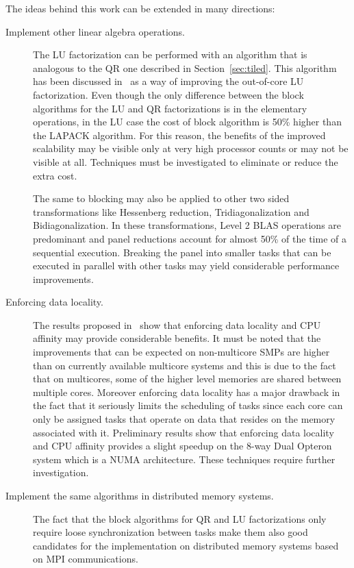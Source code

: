 \documentclass[runningheads]{llncs}
\begin{document}
\noindent
The ideas behind this work can be extended in many directions:
\begin{description}
\item[Implement other linear algebra operations.] The LU factorization
  can be performed with an algorithm that is analogous to the QR one
  described in Section~\ref{sec:tiled}. This algorithm has been
  discussed in~\cite{yip_ooc,vdgooclu} as a way of improving the out-of-core LU factorization.
  Even though the only difference between the
  block algorithms for the LU and QR factorizations is in the elementary
  operations, in the LU case the cost of block algorithm is 50\%
  higher than the LAPACK algorithm. For this reason, the benefits of
  the improved scalability may be visible only at very high processor
  counts or may not be visible at all. Techniques must be investigated
  to eliminate or reduce the extra cost.

  The same to blocking may also be applied to other two sided
  transformations like Hessenberg reduction, Tridiagonalization and
  Bidiagonalization. In these transformations, Level 2 BLAS operations are
  predominant and panel reductions account for almost 50\% of the time
  of a sequential execution. Breaking the panel into smaller tasks
  that can be executed in parallel with other tasks may yield
  considerable performance improvements.

\item[Enforcing data locality.] The results proposed in~\cite{1248397}
  show that enforcing data locality and CPU affinity may provide
  considerable benefits. It must be noted that the improvements that
  can be expected on non-multicore SMPs are higher than on currently
  available multicore systems and this is due to the fact that
  on multicores, some of the higher level memories are shared between
  multiple cores. Moreover enforcing data locality has a major
  drawback in the fact that it seriously limits the scheduling of
  tasks since each core can only be assigned tasks that operate on
  data that resides on the memory associated with it. Preliminary
  results show that enforcing data locality and CPU affinity provides
  a slight speedup on the 8-way Dual Opteron system which is a NUMA
  architecture. These techniques require further investigation.

\item[Implement the same algorithms in distributed memory
  systems.] The fact that the block algorithms for QR and LU
  factorizations only require
  loose synchronization between tasks make them also good candidates
  for the implementation on distributed memory systems based on MPI
  communications.


\end{description}
\end{document}
